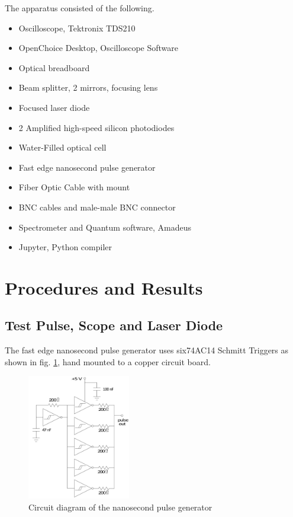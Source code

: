 \documentclass[aps,prl,reprint]{revtex4-2}
\begin{document}
The apparatus consisted of the following.
\begin{itemize}
\item Oscilloscope, Tektronix TDS210
\item OpenChoice Desktop, Oscilloscope Software
\item Optical breadboard
\item Beam splitter, 2 mirrors, focusing lens
\item Focused laser diode
\item 2 Amplified high-speed silicon photodiodes
\item Water-Filled optical cell
\item Fast edge nanosecond pulse generator
\item Fiber Optic Cable with mount
\item BNC cables and male-male BNC connector
\item Spectrometer and Quantum software, Amadeus
\item Jupyter, Python compiler
\end{itemize}

\section{Procedures and Results}

\subsection{Test Pulse, Scope and Laser Diode}
The  fast  edge  nanosecond  pulse  generator  uses  six74AC14 Schmitt Triggers as shown 
in fig. \ref{Schmitt}, hand mounted to a copper circuit board.\\

\begin{figure}[h]
\includegraphics[width=0.4\textwidth]{./BMPs/Schmitt.jpg}
\caption{\label{Schmitt} Circuit diagram of the nanosecond pulse generator}
\end{figure}
\end{document}
